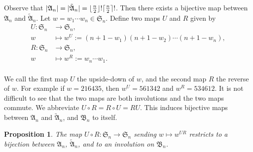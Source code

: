 \documentclass[12pt]{amsart}
\DeclarePairedDelimiter\ceil{\lceil}{\rceil}
\DeclarePairedDelimiter\floor{\lfloor}{\rfloor}
\newtheorem{prop}[thm]{Proposition}
\theoremstyle{definition}
\numberwithin{equation}{section}
\newcommand{\sn}{\mathfrak{S}_n}
\newcommand{\defeq}{:=}
\begin{document}
Observe that $|\mathfrak A_n|=|\tilde{\mathfrak A}_n|=\floor{\tfrac{n}{2}}!\ceil{\tfrac{n}{2}}!$. Then there exists a bijective map between $\mathfrak A_n$ and $\tilde{\mathfrak A}_n$. Let $w =  w_1 \cdots w_n \in \sn$. Define two maps $U$ and $R$ given by
\begin{equation*}
\begin{aligned}
U: \sn &\to \sn,\\
w &\mapsto w^U\defeq (n+1 -w_1)(n+1-w_2)\cdots (n+1-w_n),\\
R: \sn &\to \sn,\\
w &\mapsto w^R\defeq w_n \cdots w_1.\\
\end{aligned}
\end{equation*}

We call the first map $U$ the upside-down of $w$, and the second map $R$ the reverse of $w$. For example if $w = 216435 $, then $w^U = 561342$ and $w^R = 534612$. It is not difficult to see that the two maps are both involutions and the two maps commute. We abbreviate $U\circ R = R \circ U =RU$. This induces bijective maps between $\mathfrak A_n$ and $\tilde{\mathfrak A}_n$, and $\mathfrak B_n$ to itself.

\begin{prop}\label{p: U and R}
The map $U \circ R: \sn \rightarrow \sn$ sending $w \mapsto w^{UR}$ restricts to a bijection between
$\mathfrak A_n$, $\tilde{\mathfrak A}_n$, and to an involution on $\mathfrak B_n$.
\end{prop}
\end{document}

